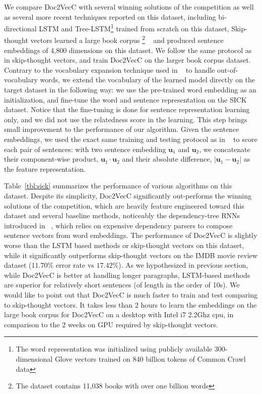 \documentclass{article} \usepackage{iclr2017_conference,times}
\newcommand{\name}{Doc2VecC}
\newcommand{\ul}{\mathbf{u}}
\begin{document}
We compare \name{} with several  winning solutions of the competition as well as several more recent techniques reported on this dataset, including bi-directional LSTM and Tree-LSTM\footnote{The word representation was initialized using
publicly available 300-dimensional Glove vectors trained on 840 billion tokens of Common Crawl data} trained from scratch on this dataset, Skip-thought vectors learned a large book corpus \footnote{The dataset contains 11,038 books with over one billion words} ~\citep{moviebook} and produced sentence embeddings of 4,800 dimensions on this dataset. We follow the same protocol as in skip-thought vectors, and train \name{} on the larger book corpus dataset. Contrary to the vocabulary expansion technique used in ~\citep{kiros2015skip} to handle out-of-vocabulary words, we extend the vocabulary of the learned model directly on the target dataset in the following way:  we use the pre-trained word embedding as an initialization, and fine-tune the word and sentence representation on the SICK dataset. Notice that the fine-tuning is done for sentence representation learning only, and we did not use the relatedness score in the learning.  This step brings small improvement to the performance of our algorithm. Given the sentence embeddings, we used the exact same training and testing protocol as in ~\citep{ kiros2015skip} to score each pair of sentences:  with two sentence embedding $\ul_1$ and $\ul_2$, we concatenate their component-wise product, $\ul_1 \cdot \ul_2$ and their absolute difference, $|\ul_1 - \ul_2|$ as the feature representation. 

Table~\ref{tbl:sick} summarizes the performance of various algorithms on this dataset. Despite its simplicity, \name{} significantly out-performs the winning solutions of the competition, which are heavily feature engineered toward this dataset and several baseline methods, noticeably the dependency-tree RNNs introduced in ~\citep{socher2014grounded}, which relies on expensive dependency parsers to compose sentence vectors from word embeddings. The performance of \name{} is slightly worse than the LSTM based methods or skip-thought vectors on this dataset, while it significantly outperforms skip-thought vectors on the IMDB movie review dataset ($11.70\%$ error rate vs $17.42\%$).  As we hypothesized in previous section, while \name{} is better at handling longer paragraphs, LSTM-based methods are superior for relatively short sentences (of length in the order of 10s). 
We would like to point out that \name{} is much faster to train and test comparing to skip-thought vectors. It takes less than 2 hours to learn the embeddings on the large book corpus for \name{} on a desktop with Intel i7 2.2Ghz cpu, in comparison to the 2 weeks on GPU required by skip-thought vectors. 
\end{document}
